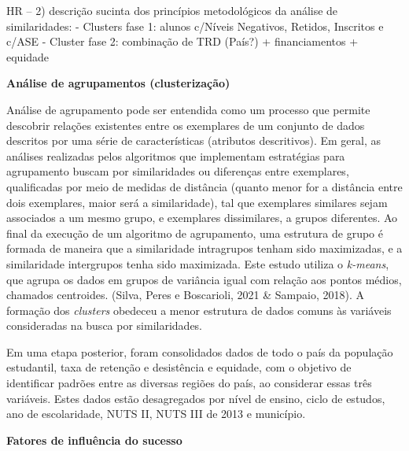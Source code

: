 \documentclass[
]{book}
\begin{document}
HR -- 2) descrição sucinta dos princípios metodológicos da análise de similaridades:
- Clusters fase 1: alunos c/Níveis Negativos, Retidos, Inscritos e c/ASE
- Cluster fase 2: combinação de TRD (País?) + financiamentos + equidade

\textbf{Análise de agrupamentos (clusterização)}

Análise de agrupamento pode ser entendida como um processo que permite descobrir relações existentes entre os exemplares de um conjunto de dados descritos por uma série de características (atributos descritivos). Em geral, as análises realizadas pelos algoritmos que implementam estratégias para agrupamento buscam por similaridades ou diferenças entre exemplares, qualificadas por meio de medidas de distância (quanto menor for a distância entre dois exemplares, maior será a similaridade), tal que exemplares similares sejam associados a um mesmo grupo, e exemplares dissimilares, a grupos diferentes. Ao final da execução de um algoritmo de agrupamento, uma estrutura de grupo é formada de maneira que a similaridade intragrupos tenham sido maximizadas, e a similaridade intergrupos tenha sido maximizada. Este estudo utiliza o \emph{k-means}, que agrupa os dados em grupos de variância igual com relação aos pontos médios, chamados centroides. (Silva, Peres e Boscarioli, 2021 \& Sampaio, 2018). A formação dos \emph{clusters} obedeceu a menor estrutura de dados comuns às variáveis consideradas na busca por similaridades.

Em uma etapa posterior, foram consolidados dados de todo o país da população estudantil, taxa de retenção e desistência e equidade, com o objetivo de identificar padrões entre as diversas regiões do país, ao considerar essas três variáveis. Estes dados estão desagregados por nível de ensino, ciclo de estudos, ano de escolaridade, NUTS II, NUTS III de 2013 e município.

\textbf{Fatores de influência do sucesso}
\end{document}
